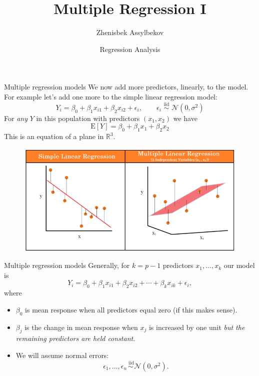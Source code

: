 \documentclass{beamer}
\title{Multiple Regression I}
\author{Zhenisbek Assylbekov}
\institute{Department of Mathematics}
\date{Regression Analysis}
\newcommand{\E}{\mathrm{E}}
\begin{document}
\begin{frame}
  \titlepage
\end{frame}

\begin{frame}{Multiple regression models}
We now add more predictors, linearly, to the model. \pause For example let's add one more to the simple linear regression model:
$$
Y_i=\beta_0+\beta_1 x_{i1}+\beta_2 x_{i2}+\epsilon_i,\qquad \epsilon_i\,\,{\stackrel{\text{iid}}{\sim}}\,\,\mathcal{N}(0,\sigma^2)
$$
\pause For \textit{any} $Y$ in this population with predictors $(x_1,x_2)$ we have
$$
\E[Y]=\beta_0+\beta_1 x_1 + \beta_2 x_2
$$
\pause This is an equation of a plane in $\mathbb{R}^3$.

\pause \begin{figure}
    \centering
    \includegraphics[height=.4\textheight]{plots/reg_plane.png}
\end{figure}
\end{frame}

\begin{frame}{Multiple regression models}
Generally, for $k=p-1$ predictors $x_1,\ldots,x_k$ our model is
$$
Y_i=\beta_0+\beta_1 x_{i1}+\beta_2 x_{i2} + \cdots + \beta_k x_{ik} + \epsilon_i,
$$
where
\begin{itemize}
\item\pause $\beta_0$ is \pause mean response when all predictors equal zero (if this makes sense).
\item\pause $\beta_j$ is \pause the change in mean response when $x_j$ is increased by one unit \textit{but the remaining predictors are held  constant}.
\item\pause We will assume normal errors:
$$
\epsilon_1, \ldots, \epsilon_n\stackrel{\text{ iid}}{\sim}\mathcal{N}(0, \sigma^2).
$$
\end{itemize}
\end{frame}
\end{document}
